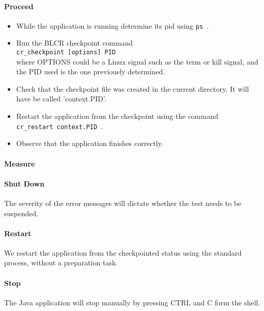 \paragraph{Proceed}
\begin{itemize}
\item While the application is running determine its pid using {\tt ps }.
\item Run the BLCR checkpoint command\\
	{\tt cr\_checkpoint [options] PID}\\
	where OPTIONS could be a Linux signal such as the term or kill signal, and the PID used is the one previously determined.
\item Check that the checkpoint file was created in the current directory. It will have be called 'context.PID'.
\item Restart the application from the checkpoint using the command\\
	{\tt cr\_restart context.PID }.
\item Observe that the application finishes correctly.
\end{itemize}

\paragraph{Measure}

\paragraph{Shut Down}
The severity of the error messages will dictate whether the test needs to be suspended.

\paragraph{Restart}
We restart the application from the checkpointed status using the standard process, without a preparation task.

\paragraph{Stop}
The Java application will stop manually by pressing CTRL and C form the shell.

